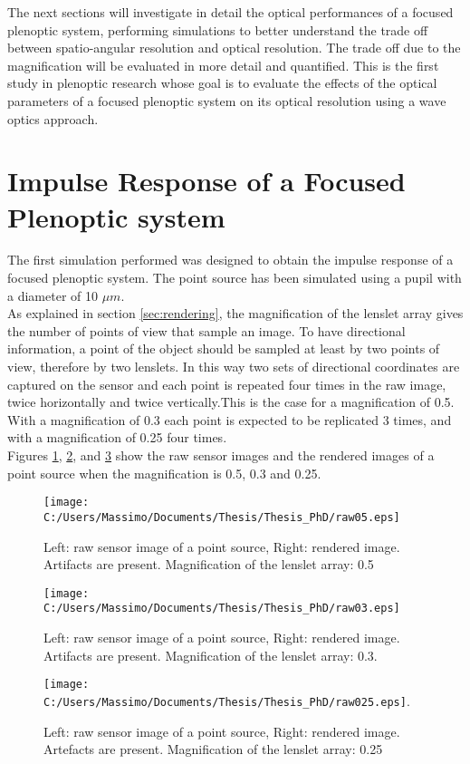 The next sections will investigate in detail the optical performances of a focused plenoptic system, performing simulations to better understand the trade off between spatio-angular resolution and optical resolution. The trade off due to the magnification will be evaluated in more detail and quantified. This is the first study in plenoptic research whose goal is to evaluate the effects of the optical parameters of a focused plenoptic system on its optical resolution using a wave optics approach.
\section{Impulse Response of a Focused Plenoptic system}
\label{sec:impulse}
The first simulation performed was designed to obtain the impulse response of a focused plenoptic system. The point source has been simulated using a pupil with a diameter of 10 $\mu m$.\\
As explained in section \ref{sec:rendering}, the magnification of the lenslet array gives the number of points of view that sample an image. To have directional information, a point of the object should be sampled at least by two points of view, therefore by two  lenslets. In this way two sets of directional coordinates are captured on the sensor and each point is repeated four times in the raw image, twice horizontally and twice vertically.This is the case for a magnification of 0.5. With a magnification of 0.3 each point is expected to be replicated 3 times, and with a magnification of 0.25 four times.\\
Figures \ref{fig:point05}, \ref{fig:point03}, and \ref{fig:point025} show the raw sensor images and the rendered images of a point source when the magnification is 0.5, 0.3 and 0.25.  
\begin{figure}[H]
	\centering
	\texttt{[image: C:/Users/Massimo/Documents/Thesis/Thesis\_PhD/raw05.eps]}
	\caption{\label{fig:point05} Left: raw sensor image of a point source, Right: rendered image. Artifacts are present. Magnification of the lenslet array: 0.5 }
\end{figure}
\begin{figure}[H]
	\centering
	\texttt{[image: C:/Users/Massimo/Documents/Thesis/Thesis\_PhD/raw03.eps]}
	\caption{\label{fig:point03} Left: raw sensor image of a point source, Right: rendered image. Artifacts are present. Magnification of the lenslet array: 0.3.}
\end{figure}
\begin{figure}[H]
	\centering
	\texttt{[image: C:/Users/Massimo/Documents/Thesis/Thesis\_PhD/raw025.eps]}.
	\caption{\label{fig:point025} Left: raw sensor image of a point source, Right: rendered image. Artefacts are present. Magnification of the lenslet array: 0.25 }
\end{figure}
